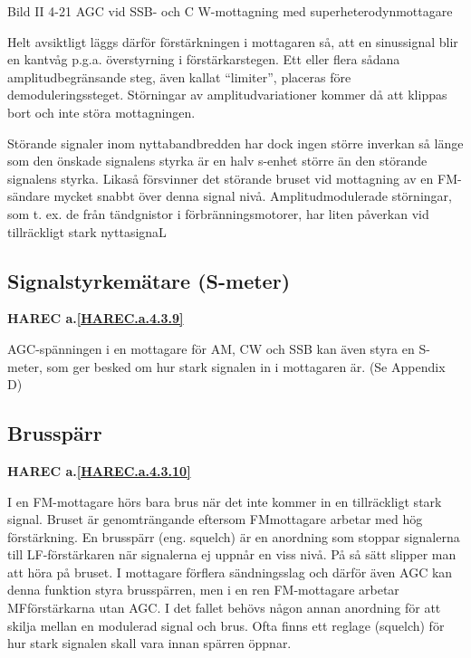 Bild II 4-21 AGC vid SSB- och C W-mottagning med superheterodynmottagare

Helt avsiktligt läggs därför förstärkningen i mottagaren så, att en
sinussignal blir en kantvåg p.g.a. överstyrning i
förstärkarstegen. Ett eller flera sådana amplitudbegränsande steg,
även kallat ``limiter'', placeras före demoduleringssteget. Störningar
av amplitudvariationer kommer då att klippas bort och inte störa
mottagningen.

Störande signaler inom nyttabandbredden har dock ingen större inverkan
så länge som den önskade signalens styrka är en halv s-enhet större än
den störande signalens styrka. Likaså försvinner det störande bruset
vid mottagning av en FM-sändare mycket snabbt över denna signal
nivå. Amplitudmodulerade störningar, som t. ex. de från tändgnistor i
förbränningsmotorer, har liten påverkan vid tillräckligt stark
nyttasignaL

\subsection{Signalstyrkemätare (S-meter)}
\textbf{HAREC a.\ref{HAREC.a.4.3.9}\label{myHAREC.a.4.3.9}}

AGC-spänningen i en mottagare för AM, CW och SSB kan även styra en
S-meter, som ger besked om hur stark signalen in i mottagaren är. (Se
Appendix D)

\subsection{Brusspärr}
\textbf{HAREC a.\ref{HAREC.a.4.3.10}\label{myHAREC.a.4.3.10}}

I en FM-mottagare hörs bara brus när det inte kommer in en
tillräckligt stark signal.  Bruset är genomträngande eftersom
FMmottagare arbetar med hög förstärkning. En brusspärr (eng. squelch)
är en anordning som stoppar signalerna till LF-förstärkaren när
signalerna ej uppnår en viss nivå. På så sätt slipper man att höra på
bruset. I mottagare förflera sändningsslag och därför även AGC kan
denna funktion styra brusspärren, men i en ren FM-mottagare arbetar
MFförstärkarna utan AGC. I det fallet behövs någon annan anordning för
att skilja mellan en modulerad signal och brus. Ofta finns ett reglage
(squelch) för hur stark signalen skall vara innan spärren öppnar.
